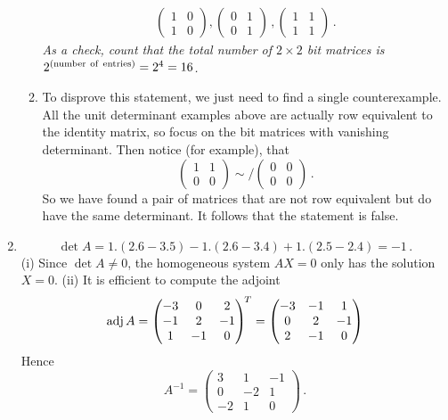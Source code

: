 \begin{enumerate}
\begin{enumerate}
\begin{gather*}
\begin{pmatrix}
1&0\\1&0
\end{pmatrix},
\begin{pmatrix}
0&1\\0&1
\end{pmatrix}\, ,
\begin{pmatrix}
1&1\\1&1
\end{pmatrix}\,.
\end{gather*}
{\itshape As a check, count that the total number of $2\times 2$ bit matrices is $2^{(\rm number\  of\  entries)}=2^4=16$.}
\item To disprove this statement, we just need to find a single counterexample. 
All the unit determinant examples above  are actually row equivalent to the identity matrix, so focus on 
the bit matrices with vanishing determinant. Then notice (for example), that
\[
\begin{pmatrix}
1&1\\0&0
\end{pmatrix}{\sim}\!\!\!\!/
\begin{pmatrix}
0&0\\0&0
\end{pmatrix}\, .
\] 
So we have found a pair of matrices that are not row equivalent but do have the same determinant. 
It follows that the statement is false.
\end{enumerate}




\item
\[
\det A= 1.(2.6-3.5)-1.(2.6-3.4)+1.(2.5-2.4)=-1\, .
\]
(i) Since $\det A\neq 0$, the homogeneous system $AX=0$ only has the solution $X=0$.
(ii) It is efficient to compute the adjoint
\[
\operatorname{adj} A= \begin{pmatrix}-3&0& 2\\ -1&2& -1 \\1&-1 & 0 \end{pmatrix}^{\!T}
= \begin{pmatrix}-3&-1& 1\\ 0&2& -1 \\2&-1 & 0 \end{pmatrix}
\]
Hence
\[A^{-1}=\begin{pmatrix}3&1& -1\\ 0&-2& 1 \\-2&1 & 0 \end{pmatrix}\, .\]


\end{enumerate}
